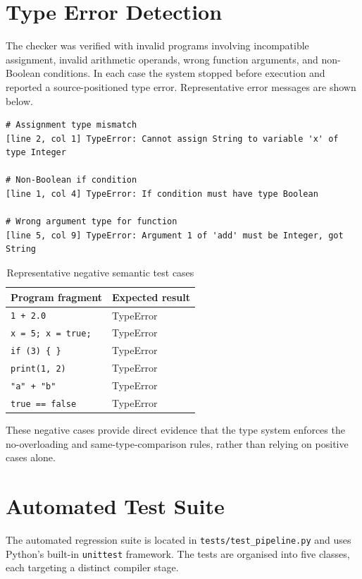 \section{Type Error Detection}
The checker was verified with invalid programs involving incompatible
assignment, invalid arithmetic operands, wrong function arguments, and
non-Boolean conditions. In each case the system stopped before execution and
reported a source-positioned type error. Representative error messages are
shown below.

\begin{lstlisting}
# Assignment type mismatch
[line 2, col 1] TypeError: Cannot assign String to variable 'x' of type Integer

# Non-Boolean if condition
[line 1, col 4] TypeError: If condition must have type Boolean

# Wrong argument type for function
[line 5, col 9] TypeError: Argument 1 of 'add' must be Integer, got String
\end{lstlisting}

\begin{table}[H]
\centering
\caption{Representative negative semantic test cases}
\label{tab:negative-tests}
\small
\begin{tabular}{ll}
\toprule
Program fragment & Expected result \\
\midrule
\texttt{1 + 2.0}             & TypeError \\
\texttt{x = 5; x = true;}    & TypeError \\
\texttt{if (3) \{ \}}        & TypeError \\
\texttt{print(1, 2)}         & TypeError \\
\texttt{"a" + "b"}           & TypeError \\
\texttt{true == false}       & TypeError \\
\bottomrule
\end{tabular}
\end{table}

These negative cases provide direct evidence that the type system enforces
the no-overloading and same-type-comparison rules, rather than relying on
positive cases alone.

\section{Automated Test Suite}
The automated regression suite is located in \texttt{tests/test\_pipeline.py}
and uses Python's built-in \texttt{unittest} framework. The tests are
organised into five classes, each targeting a distinct compiler stage.

